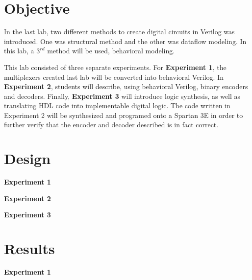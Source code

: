 \documentclass[a4paper,12pt]{article}
\begin{document}
\section*{Objective}

\hspace{15pt}In the last lab, two different methods to create digital circuits in Verilog was introduced. One was
structural method and the other was dataflow modeling. In this lab, a $3^{rd}$ method will be used, behavioral modeling.

This lab consisted of three separate experiments. For \textbf{Experiment 1}, the multiplexers created last lab will
be converted into behavioral Verilog. In \textbf{Experiment 2}, students will describe, using behavioral Verilog, binary encoders and decoders. Finally, \textbf{Experiment 3} will introduce logic synthesis, as well as translating HDL code into implementable digital logic. The code written in Experiment 2 will be synthesized and programed onto a Spartan 3E in order to further verify that the encoder and decoder described is in fact correct.

\section*{Design}

\textbf{Experiment 1}
 

\hspace{-15pt}\textbf{Experiment 2}

\hspace{-15pt}\textbf{Experiment 3}

\section*{Results}

\textbf{Experiment 1}
\end{document}
